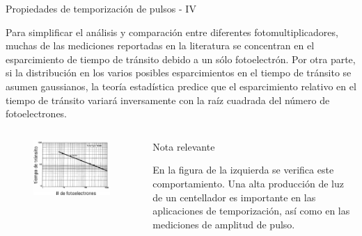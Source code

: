 \documentclass[a4paper,10pt]{beamer}
\begin{document}
\begin{frame}{Propiedades de temporización de pulsos - IV}
 \begin{justify}

 Para simplificar el análisis y comparación entre diferentes fotomultiplicadores, 
 muchas de las mediciones reportadas en la literatura se concentran en el 
 esparcimiento de tiempo de tránsito debido a un sólo fotoelectrón. Por otra parte,
 si la distribución en los varios posibles esparcimientos en el tiempo de tránsito 
 se asumen gaussianos, la teoría estadística predice que el esparcimiento relativo
 en el tiempo de tránsito variará inversamente con la raíz cuadrada del número 
 de fotoelectrones.

 \end{justify}
 
 \begin{columns}[c]
  \column{2in}
  \begin{figure}
   \center 
   \includegraphics[scale=0.31]{fig24a}
  \end{figure}
  
  \column{2in}
  \begin{block}{Nota relevante}
  \begin{justify}
   En la figura de la izquierda se verifica este comportamiento. Una alta producción 
   de luz de un centellador es importante en las aplicaciones de temporización, así 
   como en las mediciones de amplitud de pulso.
   \end{justify}
  \end{block}
 \end{columns}

\end{frame}
\end{document}
